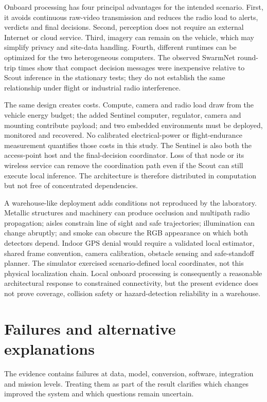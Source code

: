 Onboard processing has four principal advantages for the intended scenario.
First, it avoids continuous raw-video transmission and reduces the radio load
to alerts, verdicts and final decisions. Second, perception does not require an
external Internet or cloud service. Third, imagery can remain on the vehicle,
which may simplify privacy and site-data handling. Fourth, different runtimes
can be optimized for the two heterogeneous computers. The observed SwarmNet
round-trip times show that compact decision messages were inexpensive relative
to Scout inference in the stationary tests; they do not establish the same
relationship under flight or industrial radio interference.

The same design creates costs. Compute, camera and radio load draw from the
vehicle energy budget; the added Sentinel computer, regulator, camera and
mounting contribute payload; and two embedded environments must be deployed,
monitored and recovered. No calibrated electrical-power or flight-endurance
measurement quantifies those costs in this study. The Sentinel is also both
the access-point host and the final-decision coordinator. Loss of that node or
its wireless service can remove the coordination path even if the Scout can
still execute local inference. The architecture is therefore distributed in
computation but not free of concentrated dependencies.

A warehouse-like deployment adds conditions not reproduced by the laboratory.
Metallic structures and machinery can produce occlusion and multipath radio
propagation; aisles constrain line of sight and safe trajectories; illumination
can change abruptly; and smoke can obscure the RGB appearance on which both
detectors depend. Indoor GPS denial would require a validated local estimator,
shared frame convention, camera calibration, obstacle sensing and safe-standoff
planner. The simulator exercised scenario-defined local coordinates, not this
physical localization chain. Local onboard processing is consequently a
reasonable architectural response to constrained connectivity, but the present
evidence does not prove coverage, collision safety or hazard-detection
reliability in a warehouse.

\section{Failures and alternative explanations}
\label{sec:discussion:4}

The evidence contains failures at data, model, conversion, software,
integration and mission levels. Treating them as part of the result clarifies
which changes improved the system and which questions remain uncertain.


